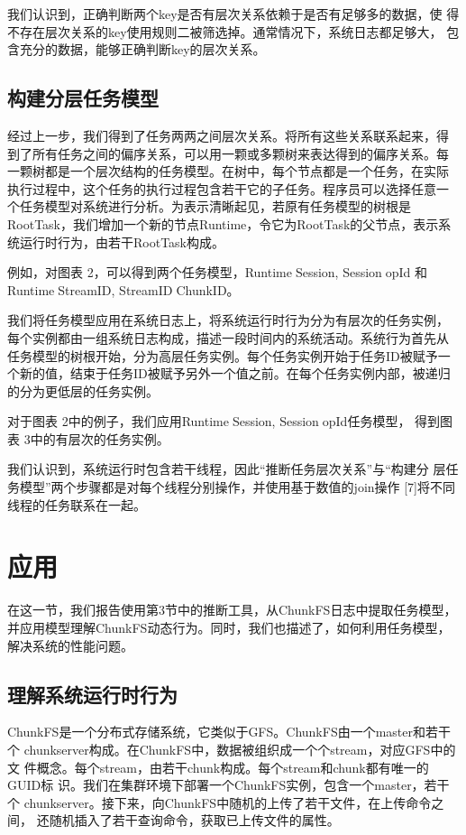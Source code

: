 我们认识到，正确判断两个key是否有层次关系依赖于是否有足够多的数据，使
得不存在层次关系的key使用规则二被筛选掉。通常情况下，系统日志都足够大，
包含充分的数据，能够正确判断key的层次关系。

\subsection{构建分层任务模型}

经过上一步，我们得到了任务两两之间层次关系。将所有这些关系联系起来，得
到了所有任务之间的偏序关系，可以用一颗或多颗树来表达得到的偏序关系。每
一颗树都是一个层次结构的任务模型。在树中，每个节点都是一个任务，在实际
执行过程中，这个任务的执行过程包含若干它的子任务。程序员可以选择任意一
个任务模型对系统进行分析。为表示清晰起见，若原有任务模型的树根是
RootTask，我们增加一个新的节点Runtime，令它为RootTask的父节点，表示系
统运行时行为，由若干RootTask构成。

例如，对图表 2，可以得到两个任务模型，RuntimeSession, SessionopId
和RuntimeStreamID, StreamIDChunkID。

我们将任务模型应用在系统日志上，将系统运行时行为分为有层次的任务实例，
每个实例都由一组系统日志构成，描述一段时间内的系统活动。系统行为首先从
任务模型的树根开始，分为高层任务实例。每个任务实例开始于任务ID被赋予一
个新的值，结束于任务ID被赋予另外一个值之前。在每个任务实例内部，被递归
的分为更低层的任务实例。

对于图表 2中的例子，我们应用RuntimeSession, SessionopId任务模型，
得到图表 3中的有层次的任务实例。

我们认识到，系统运行时包含若干线程，因此“推断任务层次关系”与“构建分
层任务模型”两个步骤都是对每个线程分别操作，并使用基于数值的join操作
[7]将不同线程的任务联系在一起。

\section{应用}

在这一节，我们报告使用第3节中的推断工具，从ChunkFS日志中提取任务模型，
并应用模型理解ChunkFS动态行为。同时，我们也描述了，如何利用任务模型，
解决系统的性能问题。

\subsection{理解系统运行时行为}

ChunkFS是一个分布式存储系统，它类似于GFS。ChunkFS由一个master和若干个
chunkserver构成。在ChunkFS中，数据被组织成一个个stream，对应GFS中的文
件概念。每个stream，由若干chunk构成。每个stream和chunk都有唯一的GUID标
识。我们在集群环境下部署一个ChunkFS实例，包含一个master，若干个
chunkserver。接下来，向ChunkFS中随机的上传了若干文件，在上传命令之间，
还随机插入了若干查询命令，获取已上传文件的属性。

